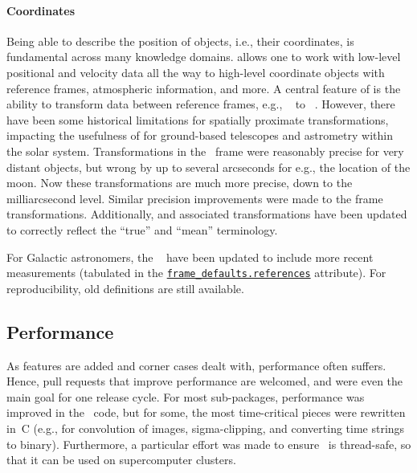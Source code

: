 \documentclass[modern]{aastex631}
\begin{document}
\paragraph{Coordinates}

Being able to describe the position of objects, i.e., their coordinates, is
fundamental across many knowledge domains. \astropycoordinates allows one to
work with low-level positional and velocity data all the way to high-level
coordinate objects with reference frames, atmospheric information, and more. A
central feature of \astropycoordinates is the ability to transform data between
reference frames, e.g., \astropyICRS\ \citep{ICRS:1997} to \astropyGalacticLSR\
\citep{GalacticLSR:2010}. However, there have been some historical limitations
for spatially proximate transformations, impacting the usefulness of
\astropycoordinates for ground-based telescopes and astrometry within the
solar system. Transformations in the \astropyAltAz\ frame were reasonably
precise for very distant objects, but wrong by up to several arcseconds for
e.g., the location of the moon. Now these transformations are much more precise,
down to the milliarcsecond level. Similar precision improvements were made to
the
frame transformations. Additionally,
and associated transformations have been updated to correctly reflect the “true”
and “mean” terminology.

For Galactic astronomers, the \astropyGalactocentric\
have been updated to include more recent measurements (tabulated in the
\href{https://docs.astropy.org/en/stable/api/astropy.coordinates.galactocentric_frame_defaults.html#astropy.coordinates.galactocentric_frame_defaults.references}{\texttt{frame\_defaults.references}}
attribute). For reproducibility, old definitions are still available.


\subsection{Performance} \label{sec:core-features-performance}

As features are added and corner cases dealt with, performance often suffers.
Hence, pull requests that improve performance are welcomed, and were even the
main goal for one release cycle. For most sub-packages, performance was
improved in the \python\ code, but for some, the most time-critical pieces were
rewritten in~C (e.g., for convolution of images, sigma-clipping, and converting
time strings to binary). Furthermore, a particular effort was made to ensure
\astropypkg\ is thread-safe, so that it can be used on supercomputer clusters.
\end{document}
